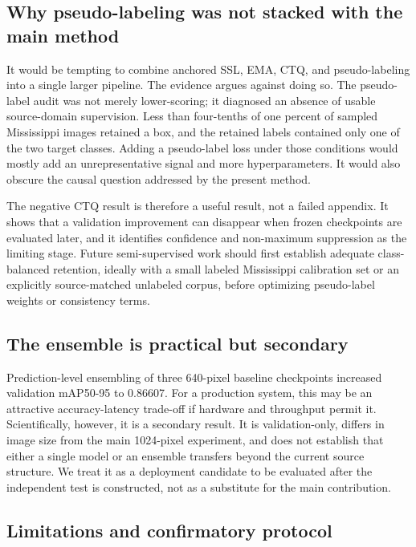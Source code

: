 \documentclass[preprint,12pt,authoryear]{elsarticle}
\newcommand{\metric}{mAP50-95}
\begin{document}
\subsection{Why pseudo-labeling was not stacked with the main method}

It would be tempting to combine anchored SSL, EMA, CTQ, and pseudo-labeling into a single larger pipeline. The evidence argues against doing so. The pseudo-label audit was not merely lower-scoring; it diagnosed an absence of usable source-domain supervision. Less than four-tenths of one percent of sampled Mississippi images retained a box, and the retained labels contained only one of the two target classes. Adding a pseudo-label loss under those conditions would mostly add an unrepresentative signal and more hyperparameters. It would also obscure the causal question addressed by the present method.

The negative CTQ result is therefore a useful result, not a failed appendix. It shows that a validation improvement can disappear when frozen checkpoints are evaluated later, and it identifies confidence and non-maximum suppression as the limiting stage. Future semi-supervised work should first establish adequate class-balanced retention, ideally with a small labeled Mississippi calibration set or an explicitly source-matched unlabeled corpus, before optimizing pseudo-label weights or consistency terms.

\subsection{The ensemble is practical but secondary}

Prediction-level ensembling of three 640-pixel baseline checkpoints increased validation \metric{} to 0.86607. For a production system, this may be an attractive accuracy-latency trade-off if hardware and throughput permit it. Scientifically, however, it is a secondary result. It is validation-only, differs in image size from the main 1024-pixel experiment, and does not establish that either a single model or an ensemble transfers beyond the current source structure. We treat it as a deployment candidate to be evaluated after the independent test is constructed, not as a substitute for the main contribution.

\subsection{Limitations and confirmatory protocol}
\end{document}
